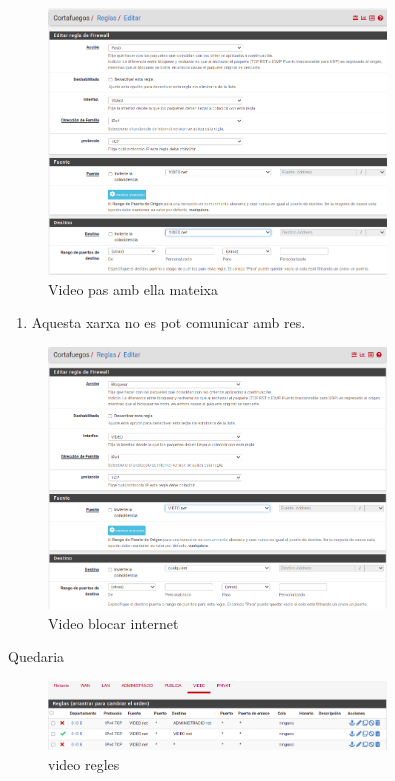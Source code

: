 \documentclass[
  10pt,
]{krantz}
\providecommand{\tightlist}{%
  \setlength{\itemsep}{0pt}\setlength{\parskip}{0pt}}
\begin{document}
\begin{figure}
\centering
\includegraphics[width=0.8\textwidth,height=\textheight]{imatges/proxmox/regla_video2.png}
\caption{Video pas amb ella mateixa}
\end{figure}

\begin{enumerate}
\def\labelenumi{\arabic{enumi}.}
\setcounter{enumi}{2}
\tightlist
\item
  Aquesta xarxa no es pot comunicar amb res.
\end{enumerate}

\begin{figure}
\centering
\includegraphics[width=0.8\textwidth,height=\textheight]{imatges/proxmox/regla_video3.png}
\caption{Video blocar internet}
\end{figure}

Quedaria

\begin{figure}
\centering
\includegraphics[width=0.8\textwidth,height=\textheight]{imatges/proxmox/regla_video4.png}
\caption{video regles}
\end{figure}
\end{document}
